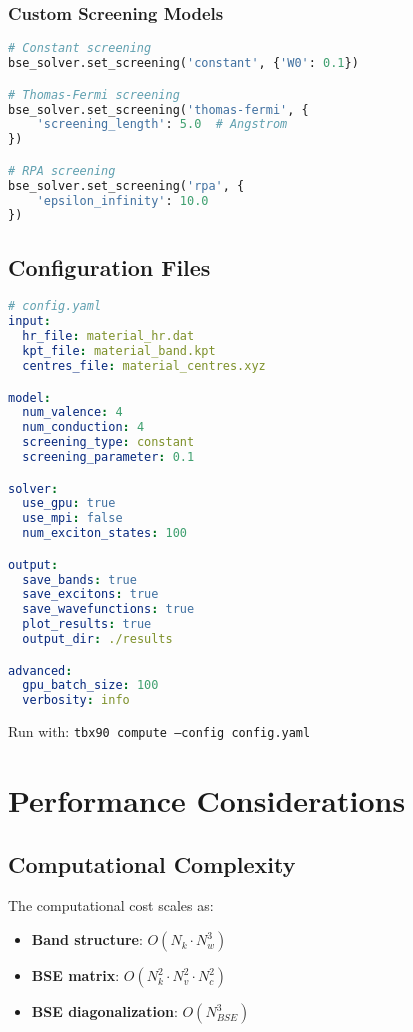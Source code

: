 \documentclass[11pt,a4paper]{article}
\newcommand{\code}[1]{\texttt{#1}}
\begin{document}
\subsubsection{Custom Screening Models}

\begin{lstlisting}[language=Python]
# Constant screening
bse_solver.set_screening('constant', {'W0': 0.1})

# Thomas-Fermi screening
bse_solver.set_screening('thomas-fermi', {
    'screening_length': 5.0  # Angstrom
})

# RPA screening
bse_solver.set_screening('rpa', {
    'epsilon_infinity': 10.0
})
\end{lstlisting}

\subsection{Configuration Files}

\begin{lstlisting}[language=yaml]
# config.yaml
input:
  hr_file: material_hr.dat
  kpt_file: material_band.kpt
  centres_file: material_centres.xyz

model:
  num_valence: 4
  num_conduction: 4
  screening_type: constant
  screening_parameter: 0.1

solver:
  use_gpu: true
  use_mpi: false
  num_exciton_states: 100

output:
  save_bands: true
  save_excitons: true
  save_wavefunctions: true
  plot_results: true
  output_dir: ./results

advanced:
  gpu_batch_size: 100
  verbosity: info
\end{lstlisting}

Run with: \code{tbx90 compute --config config.yaml}

\section{Performance Considerations}

\subsection{Computational Complexity}

The computational cost scales as:

\begin{itemize}
    \item \textbf{Band structure}: $O(N_k \cdot N_w^3)$
    \item \textbf{BSE matrix}: $O(N_k^2 \cdot N_v^2 \cdot N_c^2)$
    \item \textbf{BSE diagonalization}: $O(N_{BSE}^3)$
\end{itemize}
\end{document}
